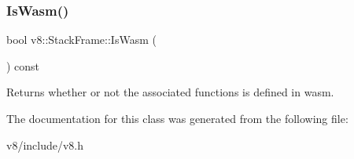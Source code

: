 \subsubsection{\texorpdfstring{Is\+Wasm()}{IsWasm()}}
{\footnotesize\ttfamily bool v8\+::\+Stack\+Frame\+::\+Is\+Wasm (\begin{DoxyParamCaption}{ }\end{DoxyParamCaption}) const}

Returns whether or not the associated functions is defined in wasm. 

The documentation for this class was generated from the following file\+:\begin{DoxyCompactItemize}
\item 
v8/include/v8.\+h\end{DoxyCompactItemize}
